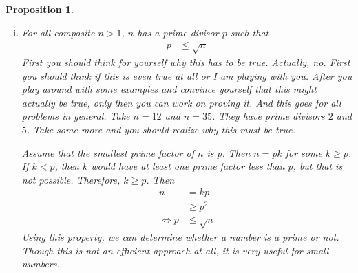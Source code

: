 \documentclass[a4paper, leqno]{article}
\newtheorem{proposition}{Proposition}
\theoremstyle{definition}
\theoremstyle{remark}
\begin{document}
\begin{proposition}
\begin{enumerate}[i.]
					What the proposition says is that, for positive integer $a,b$ there are unique integer $q$ and a unique positive integer $r$ such that $b=aq+r$ and $0\leq r<a$. We can prove this easily as well. And the uniqueness of $r$ can prove the uniqueness of $q$ as well (and vice versa). For the sake of contradiction, suppose that,
						\begin{align*}
							b = aq_1+r_1 & = aq_2+r_2
						\end{align*}
					where both $0\leq r_1,r_2<a$. From the latter, we get
						\begin{align*}
							a(q_1-q_2) & = r_2-r_1
						\end{align*}
					This equation says that $a$ divides $r_2-r_1$. Unless $|r_2-r_1|=0$, this can not be true (why?). The conclusion follows.
					\item For all composite $n > 1$, $n$ has a prime divisor $p$ such that
						\begin{align*}
							p & \leq \sqrt{n}
						\end{align*}
					First you should think for yourself why this has to be true. Actually, no. First you should think if this is even true at all or I am playing with you. After you play around with some examples and convince yourself that this might actually be true, only then you can work on proving it. And this goes for all problems in general. Take $n=12$ and $n=35$. They have prime divisors $2$ and $5$. Take some more and you should realize why this must be true.
					
					Assume that the smallest prime factor of $n$ is $p$. Then $n = pk$ for some
					$k\geq p$. If $k < p$, then $k$ would have at least one prime factor less than
					$p$, but that is not possible. Therefore, $k \geq p$. Then
						\begin{align*}
							n & = kp\\
							  & \geq p^2\\
							\iff p& \leq \sqrt{n}
						\end{align*}
					Using this property, we can determine whether a number is a prime or
					not. Though this is not an efficient approach at all, it is very useful for
					small numbers.
				\end{enumerate}
		\end{proposition}
	
\end{document}
